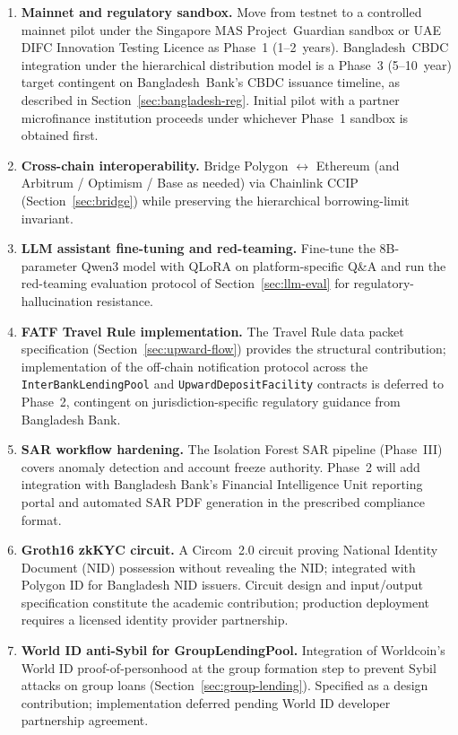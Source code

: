 \documentclass[12pt,a4paper]{report}
\begin{document}
\begin{enumerate}[noitemsep]
\item \textbf{Mainnet and regulatory sandbox.} Move from testnet to a controlled mainnet pilot under the Singapore MAS Project~Guardian sandbox or UAE DIFC Innovation Testing Licence as Phase~1 (1--2~years). Bangladesh~CBDC integration under the hierarchical distribution model is a Phase~3 (5--10~year) target contingent on Bangladesh~Bank's CBDC issuance timeline, as described in Section~\ref{sec:bangladesh-reg}. Initial pilot with a partner microfinance institution proceeds under whichever Phase~1 sandbox is obtained first.
\item \textbf{Cross-chain interoperability.} Bridge Polygon $\leftrightarrow$ Ethereum (and Arbitrum / Optimism / Base as needed) via Chainlink CCIP (Section~\ref{sec:bridge}) while preserving the hierarchical borrowing-limit invariant.
\item \textbf{LLM assistant fine-tuning and red-teaming.} Fine-tune the 8B-parameter Qwen3 model with QLoRA on platform-specific Q\&A and run the red-teaming evaluation protocol of Section~\ref{sec:llm-eval} for regulatory-hallucination resistance.

\item \textbf{FATF Travel Rule implementation.} The Travel Rule data packet specification (Section~\ref{sec:upward-flow}) provides the structural contribution; implementation of the off-chain notification protocol across the \texttt{InterBankLendingPool} and \texttt{UpwardDepositFacility} contracts is deferred to Phase~2, contingent on jurisdiction-specific regulatory guidance from Bangladesh Bank.

\item \textbf{SAR workflow hardening.} The Isolation Forest SAR pipeline (Phase~III) covers anomaly detection and account freeze authority. Phase~2 will add integration with Bangladesh Bank's Financial Intelligence Unit reporting portal and automated SAR PDF generation in the prescribed compliance format.

\item \textbf{Groth16 zkKYC circuit.} A Circom~2.0 circuit proving National Identity Document (NID) possession without revealing the NID; integrated with Polygon ID for Bangladesh NID issuers. Circuit design and input/output specification constitute the academic contribution; production deployment requires a licensed identity provider partnership.

\item \textbf{World ID anti-Sybil for GroupLendingPool.} Integration of Worldcoin's World ID proof-of-personhood at the group formation step to prevent Sybil attacks on group loans (Section~\ref{sec:group-lending}). Specified as a design contribution; implementation deferred pending World ID developer partnership agreement.


\end{enumerate}
\end{document}
